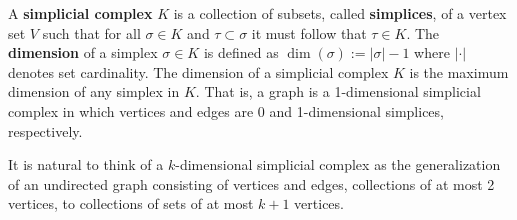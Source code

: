 


A \textbf{simplicial complex} $K$ is a collection of subsets, called \textbf{simplices}, of a vertex set $V$ such that for all $\sigma\in K$ and $\tau\subset\sigma$ it must follow that $\tau\in K$.
The \textbf{dimension} of a simplex $\sigma\in K$ is defined as $\dim(\sigma) := |\sigma|-1$ where $|\cdot|$ denotes set cardinality.
The dimension of a simplicial complex $K$ is the maximum dimension of any simplex in $K$.
That is, a graph is a 1-dimensional simplicial complex in which vertices and edges are 0 and 1-dimensional simplices, respectively.


It is natural to think of a $k$-dimensional simplicial complex as the generalization of an undirected graph consisting of vertices and edges, collections of at most 2 vertices, to collections of sets of at most $k+1$ vertices.

